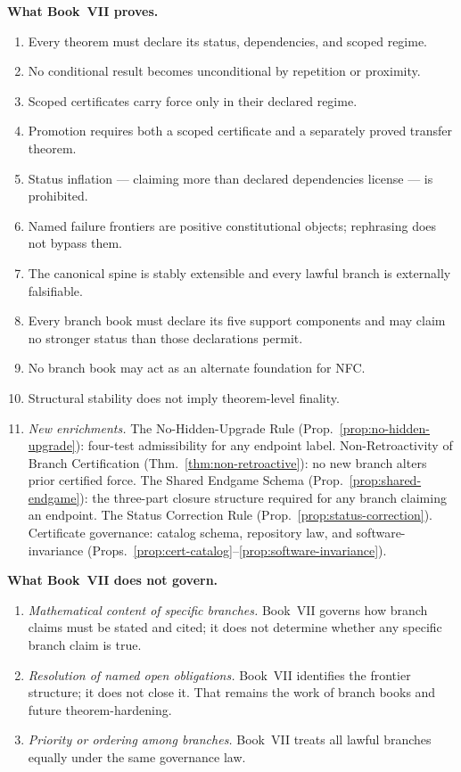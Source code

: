 \documentclass[12pt,oneside]{amsbook}
\theoremstyle{plain}
\theoremstyle{definition}
\theoremstyle{remark}
\begin{document}
\textbf{What Book~VII proves.}
\begin{enumerate}
  \item Every theorem must declare its status, dependencies, and
        scoped regime.
  \item No conditional result becomes unconditional by repetition or
        proximity.
  \item Scoped certificates carry force only in their declared regime.
  \item Promotion requires both a scoped certificate and a separately
        proved transfer theorem.
  \item Status inflation --- claiming more than declared dependencies
        license --- is prohibited.
  \item Named failure frontiers are positive constitutional objects;
        rephrasing does not bypass them.
  \item The canonical spine is stably extensible and every lawful
        branch is externally falsifiable.
  \item Every branch book must declare its five support components
        and may claim no stronger status than those declarations permit.
  \item No branch book may act as an alternate foundation for NFC.
  \item Structural stability does not imply theorem-level finality.
  \item \emph{New enrichments.}  The No-Hidden-Upgrade Rule
        (Prop.~\ref{prop:no-hidden-upgrade}): four-test admissibility
        for any endpoint label.  Non-Retroactivity of Branch
        Certification (Thm.~\ref{thm:non-retroactive}): no new branch
        alters prior certified force.  The Shared Endgame Schema
        (Prop.~\ref{prop:shared-endgame}): the three-part closure
        structure required for any branch claiming an endpoint.  The
        Status Correction Rule (Prop.~\ref{prop:status-correction}).
        Certificate governance: catalog schema, repository law, and
        software-invariance (Props.~\ref{prop:cert-catalog}--\ref{prop:software-invariance}).
\end{enumerate}

\textbf{What Book~VII does not govern.}
\begin{enumerate}
  \item \emph{Mathematical content of specific branches.}  Book~VII
        governs how branch claims must be stated and cited; it does not
        determine whether any specific branch claim is true.
  \item \emph{Resolution of named open obligations.}  Book~VII
        identifies the frontier structure; it does not close it.  That
        remains the work of branch books and future theorem-hardening.
  \item \emph{Priority or ordering among branches.}  Book~VII treats
        all lawful branches equally under the same governance law.
\end{enumerate}
\end{document}

